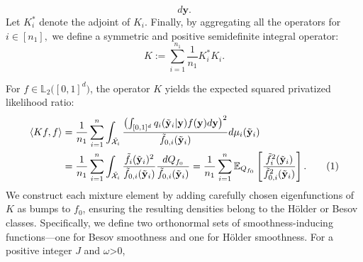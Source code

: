 \documentclass[twoside,11pt]{article}
\newcommand\numberthis{\addtocounter{equation}{1}\tag{\theequation}}
\newcommand{\Ell}{\mathbb{L}}
\newcommand{\EllTwo}{\Ell_2} %
\newcommand{\rvOne}{X}
\newcommand{\rvTwoObs}{y}
\newcommand{\vectorize}[1]{\mathbf{#1}}
\newcommand{\private}[1]{\tilde{#1}}
\newcommand{\rvCodomain}[1]{\mathcal{#1}}
\newcommand{\mE}{\mathbb{E}} %
\newcommand{\sampleIndexOne}{i}
\newcommand{\dimDensity}{d} %
\newcommand{\sampleSize}{n}
\newcommand{\privacyDensity}{q}
\newcommand{\primResLev}{J}
\begin{document}
\begin{appendix}
\begin{definition}
\begin{equation*}
			d\vectorize{y}.
		\end{equation*}
		Let $K_\sampleIndexOne^\ast$ denote the adjoint of $K_\sampleIndexOne$. Finally, by aggregating all the operators for  $\sampleIndexOne \in [\sampleSize_1],$
		we define a symmetric and positive semidefinite integral operator:
		\begin{equation*}
			K:=\sum_{\sampleIndexOne=1}^{\sampleSize_1}
			\frac{1}{\sampleSize_1}
			K_\sampleIndexOne^\ast K_\sampleIndexOne.
		\end{equation*}
	\end{definition}
	For $f \in \EllTwo \bigl( [0,1]^d \bigr) $, 
	the operator $K$ yields the expected  squared privatized likelihood ratio:
	\begin{align*} 
		\langle K f, f \rangle
		& = %
		\frac{1}{\sampleSize_1}
		\sum_{\sampleIndexOne = 1}^{\sampleSize}
		\int_{
			\private{
				\rvCodomain{\rvOne}
			}_{\sampleIndexOne}}
		\frac{
			\bigl(
			\int_{[0,1]^\dimDensity}
			\privacyDensity_\sampleIndexOne(
			\private{\vectorize{\rvTwoObs}}_\sampleIndexOne
			|
			\vectorize{\rvTwoObs}
			) f(\vectorize{\rvTwoObs})
			d{\vectorize{\rvTwoObs}}
			\bigr)^2
		}{
			\private{f}_{0,\sampleIndexOne}(\private{\vectorize{y}}_\sampleIndexOne)
		}
		d \mu_i (\private{\vectorize{y}}_\sampleIndexOne)
		\\
		& =%
		\frac{1}{\sampleSize_1}
		\sum_{\sampleIndexOne = 1}^{\sampleSize}
		\int_{
			\private{
				\rvCodomain{\rvOne}
			}_{\sampleIndexOne}}
		\frac{
			\private{f}_\sampleIndexOne(\private{\vectorize{y}}_\sampleIndexOne)^2
		}{
			\private{f}_{0,\sampleIndexOne}(\private{\vectorize{y}}_\sampleIndexOne)
		}
		\frac{dQ_{f_0}}{
			\private{f}_{0,\sampleIndexOne}(\private{\vectorize{y}}_\sampleIndexOne)
		}
		=%
		\frac{1}{\sampleSize_1}
		\sum_{\sampleIndexOne = 1}^{\sampleSize}
		\mE_{Q_{f_0}}
		\left[
		\frac{
			\private{f}^2_\sampleIndexOne(\private{\vectorize{y}}_\sampleIndexOne)
		}{
			\private{f}^2_{0,\sampleIndexOne}(\private{\vectorize{y}}_\sampleIndexOne)
		}
		\right].
		\numberthis
		\label{operator_meaning}
	\end{align*}
	We construct each mixture element by adding carefully chosen eigenfunctions of \( K \) as bumps to \( f_0 \), ensuring the resulting densities belong to the H\"older or Besov classes.
	Specifically, we define two orthonormal sets of smoothness-inducing functions—one for Besov smoothness and one for H\"older smoothness.
	For a positive integer $\primResLev$ and $\omega$>0,

\end{appendix}
\end{document}
